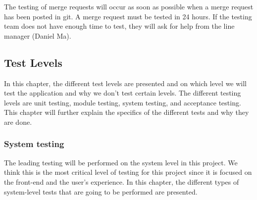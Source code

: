  \noindent The testing of merge requests will occur as soon as possible when a merge request has been posted in git. A merge request must be tested in 24 hours. If the testing team does not have enough time to test, they will ask for help from the line manager (Daniel Ma).
\subsection{Test Levels}
In this chapter, the different test levels are presented and on which level we will test the application and why we don't test certain levels. The different testing levels are unit testing, module testing, system testing, and acceptance testing. This chapter will further explain the specifics of the different tests and why they are done.



\subsubsection{System testing}
The leading testing will be performed on the system level in this project. We think this is the most critical level of testing for this project since it is focused on the front-end and the user's experience. In this chapter, the different types of system-level tests that are going to be performed are presented.
\newline

